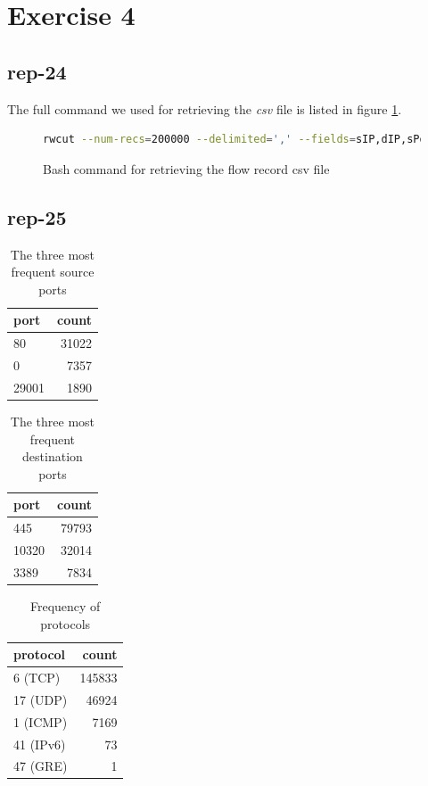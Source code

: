 \section*{Exercise 4}
\subsection*{rep-24}
The full command we used for retrieving the \textit{csv} file is listed in figure \ref{fig:bash-flowrec}.
\begin{figure}[H]
\begin{lstlisting}[language=bash]
rwcut --num-recs=200000 --delimited=',' --fields=sIP,dIP,sPort,dPort,protocol,flags,ttl,bytes team16.flowrecord.rw > team16_flowrecord.csv
\end{lstlisting}
\caption{ Bash command for retrieving the flow record csv file }
\label{fig:bash-flowrec}
\end{figure}
\subsection*{rep-25}
\begin{table}[H]
\center
\begin{tabular}{lr}
\toprule
port & count \\
\midrule
80 & 31022 \\
0 & 7357 \\
29001 & 1890 \\ 
\bottomrule
\end{tabular}
\caption{ The three most frequent source ports }
\label{tab:most-frequent-source-ports}
\end{table}

\begin{table}[H]
\center
\begin{tabular}{lr}
\toprule
port & count \\
\midrule
445 & 79793 \\
10320 & 32014 \\
3389 & 7834 \\
\bottomrule
\end{tabular}
\caption{ The three most frequent destination ports }
\label{tab:most-frequent-destination-ports}
\end{table}

\begin{table}[H]
\center
\begin{tabular}{lr}
\toprule
protocol & count \\
\midrule
6 (TCP) & 145833 \\ 
17 (UDP) & 46924 \\
1 (ICMP) & 7169 \\
41 (IPv6) & 73 \\
47 (GRE) & 1 \\
\bottomrule
\end{tabular}
\caption{ Frequency of protocols }
\label{tab:all-protocols}
\end{table}

